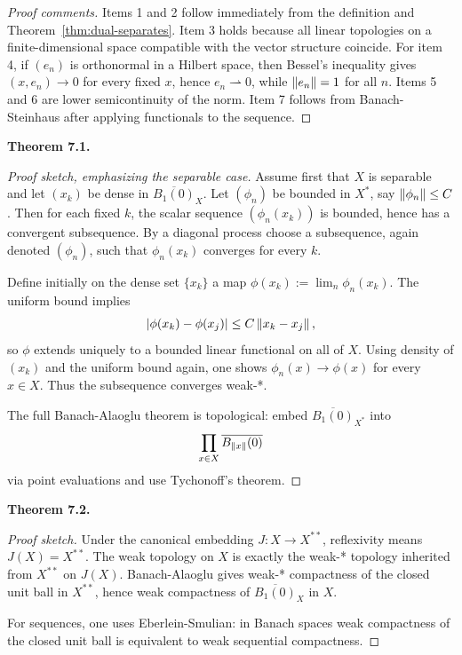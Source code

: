 \documentclass[11pt]{article}
\newcommand{\Ball}{\overline{B_1(0)}}
\newenvironment{theoremstmt}[1]{%
  \par\medskip\noindent\textbf{Theorem #1. }\itshape
}{\par\medskip}
\begin{document}
\begin{proof}[Proof comments]
Items 1 and 2 follow immediately from the definition and Theorem~\ref{thm:dual-separates}. Item 3 holds because all linear topologies on a finite-dimensional space compatible with the vector structure coincide. For item 4, if $(e_n)$ is orthonormal in a Hilbert space, then Bessel's inequality gives $(x,e_n)\to 0$ for every fixed $x$, hence $e_n\rightharpoonup 0$, while $\left\lVert e_n\right\rVert=1$ for all $n$. Items 5 and 6 are lower semicontinuity of the norm. Item 7 follows from Banach-Steinhaus after applying functionals to the sequence.
\end{proof}

\begin{theoremstmt}{7.1}
\thmBanachAlaoglu
\end{theoremstmt}

\begin{proof}[Proof sketch, emphasizing the separable case]
Assume first that $X$ is separable and let $(x_k)$ be dense in $\Ball_X$. Let $(\phi_n)$ be bounded in $X^*$, say $\left\lVert \phi_n\right\rVert\le C$. Then for each fixed $k$, the scalar sequence $(\phi_n(x_k))$ is bounded, hence has a convergent subsequence. By a diagonal process choose a subsequence, again denoted $(\phi_n)$, such that $\phi_n(x_k)$ converges for every $k$.

Define initially on the dense set $\{x_k\}$ a map $\phi(x_k):=\lim_n \phi_n(x_k)$. The uniform bound implies
\[
\left\lvert \phi(x_k)-\phi(x_j)\right\rvert\le C\left\lVert x_k-x_j\right\rVert,
\]
so $\phi$ extends uniquely to a bounded linear functional on all of $X$. Using density of $(x_k)$ and the uniform bound again, one shows $\phi_n(x)\to \phi(x)$ for every $x\in X$. Thus the subsequence converges weak-*.

The full Banach-Alaoglu theorem is topological: embed $\Ball_{X^*}$ into
\[
\prod_{x\in X}\overline{B_{\left\lVert x\right\rVert}(0)}
\]
via point evaluations and use Tychonoff's theorem.
\end{proof}

\begin{theoremstmt}{7.2}
\thmReflexiveWeaklyCompact
\end{theoremstmt}

\begin{proof}[Proof sketch]
Under the canonical embedding $J:X\to X^{**}$, reflexivity means $J(X)=X^{**}$. The weak topology on $X$ is exactly the weak-* topology inherited from $X^{**}$ on $J(X)$. Banach-Alaoglu gives weak-* compactness of the closed unit ball in $X^{**}$, hence weak compactness of $\Ball_X$ in $X$.

For sequences, one uses Eberlein-Smulian: in Banach spaces weak compactness of the closed unit ball is equivalent to weak sequential compactness.
\end{proof}
\end{document}
